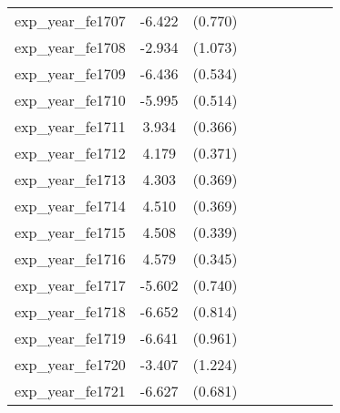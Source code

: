 {\begin{tabular}{l*{4}{cc}}
exp\_year\_fe1707&   -6.422\sym{***}&  (0.770)&                  &         &                  &         &                  &         \\
exp\_year\_fe1708&   -2.934\sym{**} &  (1.073)&                  &         &                  &         &                  &         \\
exp\_year\_fe1709&   -6.436\sym{***}&  (0.534)&                  &         &                  &         &                  &         \\
exp\_year\_fe1710&   -5.995\sym{***}&  (0.514)&                  &         &                  &         &                  &         \\
exp\_year\_fe1711&    3.934\sym{***}&  (0.366)&                  &         &                  &         &                  &         \\
exp\_year\_fe1712&    4.179\sym{***}&  (0.371)&                  &         &                  &         &                  &         \\
exp\_year\_fe1713&    4.303\sym{***}&  (0.369)&                  &         &                  &         &                  &         \\
exp\_year\_fe1714&    4.510\sym{***}&  (0.369)&                  &         &                  &         &                  &         \\
exp\_year\_fe1715&    4.508\sym{***}&  (0.339)&                  &         &                  &         &                  &         \\
exp\_year\_fe1716&    4.579\sym{***}&  (0.345)&                  &         &                  &         &                  &         \\
exp\_year\_fe1717&   -5.602\sym{***}&  (0.740)&                  &         &                  &         &                  &         \\
exp\_year\_fe1718&   -6.652\sym{***}&  (0.814)&                  &         &                  &         &                  &         \\
exp\_year\_fe1719&   -6.641\sym{***}&  (0.961)&                  &         &                  &         &                  &         \\
exp\_year\_fe1720&   -3.407\sym{**} &  (1.224)&                  &         &                  &         &                  &         \\
exp\_year\_fe1721&   -6.627\sym{***}&  (0.681)&                  &         &                  &         &                  &         \\

\end{tabular}}
